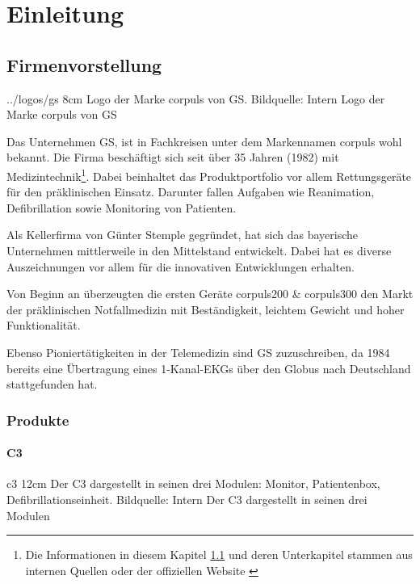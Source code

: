 \chapter{Einleitung}
\label{einleitung}
\minitoc\pagebreak


\section{Firmenvorstellung}
\label{sec:firma}
\bild
{../logos/gs}
{8cm}
{Logo der Marke \glqq corpuls\grqq{} von \acrlong*{GS}. Bildquelle: Intern}
{Logo der Marke \glqq corpuls\grqq{} von GS}

Das Unternehmen \gls{GS}, ist in Fachkreisen unter dem Markennamen \glqq corpuls\grqq{} wohl bekannt. 
Die Firma beschäftigt sich seit über 35 Jahren (1982) mit Medizintechnik\footnote{Die Informationen in diesem Kapitel \ref{sec:firma} und deren Unterkapitel stammen aus internen Quellen oder der offiziellen Website \cite{GSElektromedizinischeGerateG.StempleGmbH.}}.
Dabei beinhaltet das Produktportfolio vor allem Rettungsgeräte für den präklinischen Einsatz.
Darunter fallen Aufgaben wie Reanimation, Defibrillation sowie Monitoring von Patienten. 

Als Kellerfirma von Günter Stemple gegründet, hat sich das bayerische Unternehmen mittlerweile in den Mittelstand entwickelt.
Dabei hat es diverse Auszeichnungen vor allem für die innovativen Entwicklungen erhalten.

Von Beginn an überzeugten die ersten Geräte corpuls200 \& corpuls300 den Markt der präklinischen Notfallmedizin mit Beständigkeit, leichtem Gewicht und hoher Funktionalität. 

Ebenso Pioniertätigkeiten in der Telemedizin sind \gls{GS} zuzuschreiben, da 1984 bereits eine Übertragung eines 1-Kanal-\gls{EKG}s über den Globus nach Deutschland stattgefunden hat.


\subsection{Produkte}

\subsubsection{\acrlong*{C3}}
\bild
{c3}
{12cm}
{Der \acrlong{C3} dargestellt in seinen drei Modulen: Monitor, Patientenbox, Defibrillationseinheit. Bildquelle: Intern}
{Der \acrlong*{C3} dargestellt in seinen drei Modulen}

